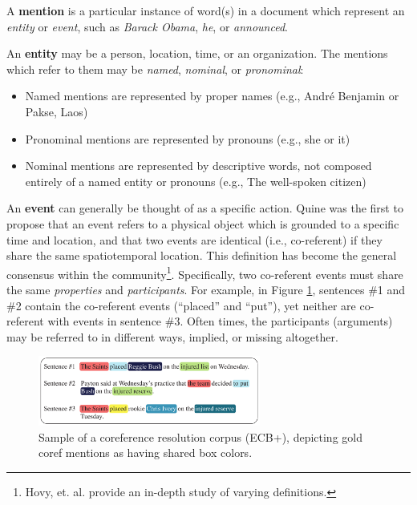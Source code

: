 A \textbf{mention} is a particular instance of word(s) in a document which represent an \textit{entity} or \textit{event}, such as \textit{Barack Obama}, \textit{he}, or \textit{announced}.

An \textbf{entity} may be a person, location, time, or an organization.  The mentions which refer to them may be \textit{named}, \textit{nominal}, or \textit{pronominal}:
\begin{itemize}
\item Named mentions are represented by proper names (e.g., Andr\'e Benjamin or Pakse, Laos) 
\item Pronominal mentions are represented by pronouns (e.g., she or it)
\item Nominal mentions are represented by descriptive words, not composed entirely of a named entity or pronouns (e.g., The well-spoken citizen)
\end{itemize}

An \textbf{event} can generally be thought of as a specific action.  Quine \cite{quine1985} was the first to propose that an event refers to a physical object which is grounded to a specific time and location, and that two events are identical (i.e., co-referent) if they share the same spatiotemporal location.  This definition has become the general consensus within the community\footnote{Hovy, et. al. \cite{Hovy2013EventsAN} provide an in-depth study of varying definitions.}.  Specifically, two co-referent events must share the same \textit{properties} and \textit{participants}.  For example, in Figure \ref{fig:corpus}, sentences \#1 and \#2 contain the co-referent events (``placed'' and ``put''), yet neither are co-referent with events in sentence \#3.  Often times, the participants (arguments) may be referred to in different ways, implied, or missing altogether.

\begin{figure}[ht]
\centering
	\includegraphics[width=0.65\textwidth]{graphics/corpus}
	\caption{Sample of a coreference resolution corpus (ECB+), depicting gold coref mentions as having shared box colors.}
	\label{fig:corpus}
\end{figure}

